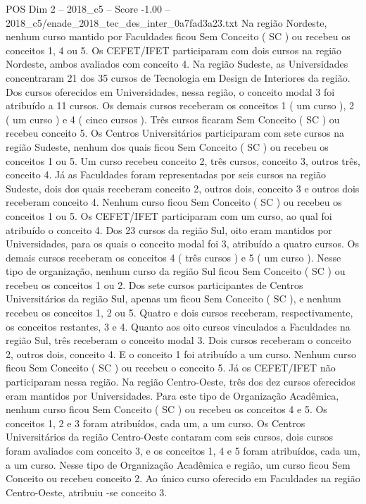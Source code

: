 \begin{textsample}{POS Dim 2 – 2018\_c5 – Score -1.00 – 2018\_c5/enade\_2018\_tec\_des\_inter\_0a7fad3a23.txt}
Na região Nordeste, nenhum curso mantido por Faculdades ficou Sem Conceito ( SC ) ou recebeu os conceitos 1, 4 ou 5.
Os CEFET/IFET participaram com dois cursos na região Nordeste, ambos avaliados com conceito 4.
Na região Sudeste, as Universidades concentraram 21 dos 35 cursos de Tecnologia em Design de Interiores da região.
Dos cursos oferecidos em Universidades, nessa região, o conceito modal 3 foi atribuído a 11 cursos.
Os demais cursos receberam os conceitos 1 ( um curso ), 2 ( um curso ) e 4 ( cinco cursos ).
Três cursos ficaram Sem Conceito ( SC ) ou recebeu conceito 5.
Os Centros Universitários participaram com sete cursos na região Sudeste, nenhum dos quais ficou Sem Conceito ( SC ) ou recebeu os conceitos 1 ou 5.
Um curso recebeu conceito 2, três cursos, conceito 3, outros três, conceito 4.
Já as Faculdades foram representadas por seis cursos na região Sudeste, dois dos quais receberam conceito 2, outros dois, conceito 3 e outros dois receberam conceito 4.
Nenhum curso ficou Sem Conceito ( SC ) ou recebeu os conceitos 1 ou 5.
Os CEFET/IFET participaram com um curso, ao qual foi atribuído o conceito 4.
Dos 23 cursos da região Sul, oito eram mantidos por Universidades, para os quais o conceito modal foi 3, atribuído a quatro cursos.
Os demais cursos receberam os conceitos 4 ( três cursos ) e 5 ( um curso ).
Nesse tipo de organização, nenhum curso da região Sul ficou Sem Conceito ( SC ) ou recebeu os conceitos 1 ou 2.
Dos sete cursos participantes de Centros Universitários da região Sul, apenas um ficou Sem Conceito ( SC ), e nenhum recebeu os conceitos 1, 2 ou 5.
Quatro e dois cursos receberam, respectivamente, os conceitos restantes, 3 e 4.
Quanto aos oito cursos vinculados a Faculdades na região Sul, três receberam o conceito modal 3.
Dois cursos receberam o conceito 2, outros dois, conceito 4.
E o conceito 1 foi atribuído a um curso.
Nenhum curso ficou Sem Conceito ( SC ) ou recebeu o conceito 5.
Já os CEFET/IFET não participaram nessa região.
Na região Centro-Oeste, três dos dez cursos oferecidos eram mantidos por Universidades.
Para este tipo de Organização Acadêmica, nenhum curso ficou Sem Conceito ( SC ) ou recebeu os conceitos 4 e 5.
Os conceitos 1, 2 e 3 foram atribuídos, cada um, a um curso.
Os Centros Universitários da região Centro-Oeste contaram com seis cursos, dois cursos foram avaliados com conceito 3, e os conceitos 1, 4 e 5 foram atribuídos, cada um, a um curso.
Nesse tipo de Organização Acadêmica e região, um curso ficou Sem Conceito ou recebeu conceito 2.
Ao único curso oferecido em Faculdades na região Centro-Oeste, atribuiu -se conceito 3.

\end{textsample}
